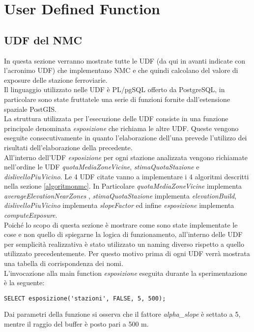 \justify
\chapter{User Defined Function}
\label{udf}
\section{UDF del NMC}
\label{udfnmc}
In questa sezione verranno mostrate tutte le UDF (da qui in avanti indicate con l'acronimo UDF) che implementano NMC e che quindi calcolano del valore di exposure delle stazione ferroviarie.\\ Il linguaggio utilizzato nelle UDF è PL/pgSQL offerto da PostgreSQL, in particolare sono state fruttatele una serie di funzioni fornite dall’estensione spaziale PostGIS.\\
La struttura utilizzata per l'esecuzione delle UDF consiste in una funzione principale denominata \textit{esposizione} che richiama le altre UDF. Queste vengono eseguite consecutivamente in quanto l'elaborazione dell'una prevede l'utilizzo dei risultati dell'elaborazione della precedente. \\
All'interno dell'UDF \textit{esposizione} per ogni stazione analizzata vengono richiamate nell'ordine le UDF \textit{quotaMediaZoneVicine}, \textit{stimaQuotaStazione} e \textit{dislivelloPiuVicino}. Le 4 UDF citate vanno a implementare i 4 algoritmi descritti nella sezione \ref{algoritmonmc}. In Particolare \textit{quotaMediaZoneVicine} implementa \textit{averageElevationNearZones} , \textit{stimaQuotaStazione} implementa \textit{elevationBuild}, \textit{dislivelloPiuVicino} implementa \textit{slopeFactor} ed infine \textit{esposizione} implementa \textit{computeExposure}.\\
Poiché lo scopo di questa sezione è mostrare come sono state implementate le cose e non quello di spiegarne la logica di funzionamento, all'interno delle UDF per semplicità realizzativa è stato utilizzato un naming diverso rispetto a quello utilizzato precedentemente. Per questo motivo prima di ogni UDF verrà mostrata una tabella di corrispondenza dei nomi.\\
L'invocazione alla main function \textit{esposizione} eseguita durante la sperimentazione è la seguente:

\begin{lstlisting}[style=mySQL]
SELECT esposizione('stazioni', FALSE, 5, 500);
\end{lstlisting}   

Dai parametri della funzione si osserva che il fattore \textit{alpha\_slope} è settato a 5, mentre il raggio del buffer è posto pari a 500 m.

